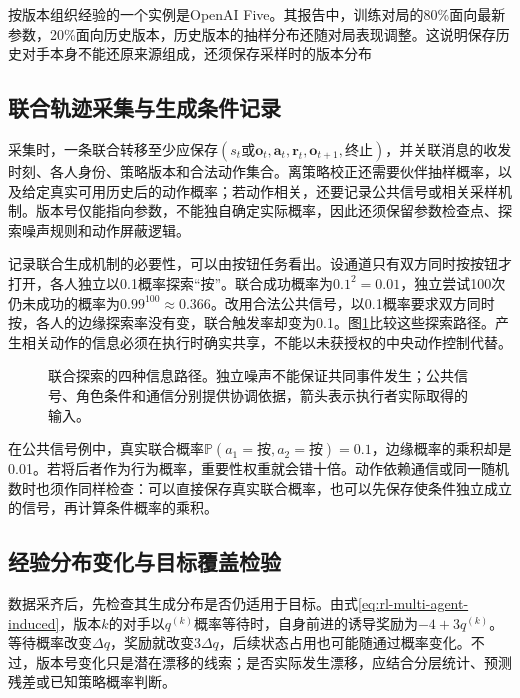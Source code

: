按版本组织经验的一个实例是OpenAI Five。其报告中，训练对局的80\%面向最新参数，20\%面向历史版本，历史版本的抽样分布还随对局表现调整。这说明保存历史对手本身不能还原来源组成，还须保存采样时的版本分布

\subsection{联合轨迹采集与生成条件记录}
\label{sec:rl-multi-agent-records}

采集时，一条联合转移至少应保存$(s_t\text{或}\bm o_t,\bm a_t,\bm r_t,\bm o_{t+1},\text{终止})$，并关联消息的收发时刻、各人身份、策略版本和合法动作集合。离策略校正还需要伙伴抽样概率，以及给定真实可用历史后的动作概率；若动作相关，还要记录公共信号或相关采样机制。版本号仅能指向参数，不能独自确定实际概率，因此还须保留参数检查点、探索噪声规则和动作屏蔽逻辑。

记录联合生成机制的必要性，可以由按钮任务看出。设通道只有双方同时按按钮才打开，各人独立以0.1概率探索“按”。联合成功概率为$0.1^2=0.01$，独立尝试100次仍未成功的概率为$0.99^{100}\approx0.366$。改用合法公共信号，以0.1概率要求双方同时按，各人的边缘探索率没有变，联合触发率却变为0.1。图\ref{fig:rl-multi-agent-exploration}比较这些探索路径。产生相关动作的信息必须在执行时确实共享，不能以未获授权的中央动作控制代替。

\begin{figure}[htbp]
 \centering
 
 \caption{联合探索的四种信息路径。独立噪声不能保证共同事件发生；公共信号、角色条件和通信分别提供协调依据，箭头表示执行者实际取得的输入。}
 \label{fig:rl-multi-agent-exploration}
\end{figure}

在公共信号例中，真实联合概率$\mathbb P(a_1=\text{按},a_2=\text{按})=0.1$，边缘概率的乘积却是0.01。若将后者作为行为概率，重要性权重就会错十倍。动作依赖通信或同一随机数时也须作同样检查：可以直接保存真实联合概率，也可以先保存使条件独立成立的信号，再计算条件概率的乘积。

\subsection{经验分布变化与目标覆盖检验}
\label{sec:rl-multi-agent-coverage}

数据采齐后，先检查其生成分布是否仍适用于目标。由式\eqref{eq:rl-multi-agent-induced}，版本$k$的对手以$q^{(k)}$概率等待时，自身前进的诱导奖励为$-4+3q^{(k)}$。等待概率改变$\Delta q$，奖励就改变$3\Delta q$，后续状态占用也可能随通过概率变化。不过，版本号变化只是潜在漂移的线索；是否实际发生漂移，应结合分层统计、预测残差或已知策略概率判断。

